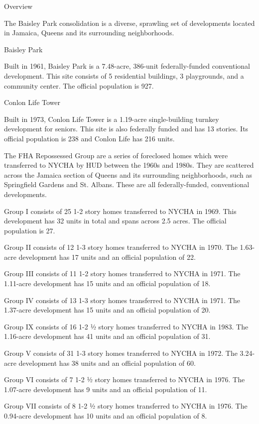Overview

The Baisley Park consolidation is a diverse, sprawling set of developments located in Jamaica, Queens and its surrounding neighborhoods. 

Baisley Park 

Built in 1961, Baisley Park is a 7.48-acre, 386-unit federally-funded conventional development. This site consists of 5 residential buildings, 3 playgrounds, and a community center. The official population is 927. 

Conlon Life Tower 

Built in 1973, Conlon Life Tower is a 1.19-acre single-building turnkey development for seniors. This site is also federally funded and has 13 stories. Its official population is 238 and Conlon Life has 216 units. 

The FHA Repossessed Group are a series of foreclosed homes which were transferred to NYCHA by HUD between the 1960s and 1980s. They are scattered across the Jamaica section of Queens and its surrounding neighborhoods, such as Springfield Gardens and St. Albans. These are all federally-funded, conventional developments. 

Group I consists of 25 1-2 story homes transferred to NYCHA in 1969. This development has 32 units in total and spans across 2.5 acres. The official population is 27. 

Group II consists of 12 1-3 story homes transferred to NYCHA in 1970. The 1.63-acre development has 17 units and an official population of 22. 

Group III consists of 11 1-2 story homes transferred to NYCHA in 1971. The 1.11-acre development has 15 units and an official population of 18. 

Group IV consists of 13 1-3 story homes transferred to NYCHA in 1971. The 1.37-acre development has 15 units and an official population of 20. 

Group IX consists of 16 1-2 ½ story homes transferred to NYCHA in 1983. The 1.16-acre development has 41 units and an official population of 31. 

Group V consists of 31 1-3 story homes transferred to NYCHA in 1972. The 3.24-acre development has 38 units and an official population of 60. 

Group VI consists of 7 1-2 ½ story homes transferred to NYCHA in 1976. The 1.07-acre development has 9 units and an official population of 11. 

Group VII consists of 8 1-2 ½ story homes transferred to NYCHA in 1976. The 0.94-acre development has 10 units and an official population of 8.

